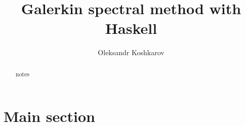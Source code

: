\documentclass[preprint,aip,pop]{article}
\begin{document}
\title{Galerkin spectral method with Haskell}
\author{Oleksandr Koshkarov}

\maketitle

\begin{abstract}
    notes
\end{abstract}



\section{Main section}
\end{document}
